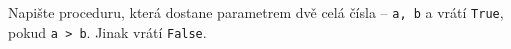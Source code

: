 \question[30]
Napište proceduru, která dostane parametrem dvě celá čísla -- \texttt{a, b} a
vrátí \texttt{True}, pokud \texttt{a > b}. Jinak vrátí \texttt{False}.